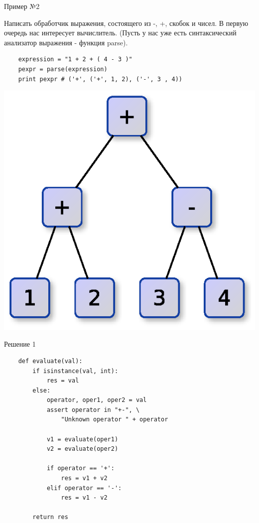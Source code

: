 \documentclass{article}
\begin{document}
\begin{center} Пример №2 \end{center}
    Написать обработчик выражения, состоящего из -, +, скобок и чисел.
    В первую очередь нас интересует вычислитель.
    (Пусть у нас уже есть синтаксический анализатор выражения - функция parse).
\begin{lstlisting}
    expression = "1 + 2 + ( 4 - 3 )"
    pexpr = parse(expression)
    print pexpr # ('+', ('+', 1, 2), ('-', 3 , 4))
\end{lstlisting}
    \begin{center} \includegraphics{images/parse_tree.eps} \end{center}     
\newpage

\begin{center} Решение 1 \end{center}
\begin{lstlisting}
    def evaluate(val):
        if isinstance(val, int):
            res = val
        else:
            operator, oper1, oper2 = val
            assert operator in "+-", \
                "Unknown operator " + operator

            v1 = evaluate(oper1)
            v2 = evaluate(oper2)

            if operator == '+':
                res = v1 + v2
            elif operator == '-':
                res = v1 - v2

        return res
\end{lstlisting}
\newpage
\end{document}
